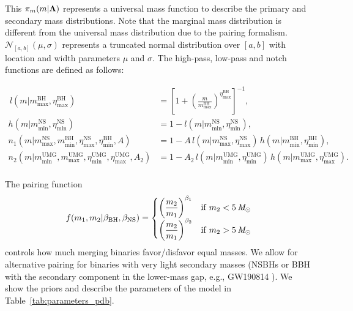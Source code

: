 This $\pi_m(m|\boldsymbol{\Lambda})$ represents a universal mass function to describe the primary and secondary mass distributions. Note that the marginal mass distribution is different from the universal mass distribution due to the pairing formalism.
$\mathcal{N}_{[a,b]}(\mu, \sigma)$ represents a truncated normal distribution over $[a,b]$ with location and width parameters $\mu$ and $\sigma$. 
The high-pass, low-pass and notch functions are defined as follows:

\begin{align}
    \,l(m|m_\text{max}^\text{BH}, \eta_\text{max}^\text{BH}) &= \left[1+\left(\frac{m}{m_\text{max}^\text{BH}}\right)^{\eta_\text{max}^\text{BH}}\right]^{-1},\\
    h(m|m_\text{min}^\text{NS}, \eta_\text{min}^\text{NS}) &= 1 - l(m|m_\text{min}^\text{NS}, \eta_\text{min}^\text{NS}),\\
    n_1(m|m_\text{max}^\text{NS}, m_\text{min}^\text{BH}, \eta_\text{max}^\text{NS}, \eta_\text{min}^\text{BH}, A) &= 1 - A \,l(m|m_\text{max}^\text{NS}, \eta_\text{max}^\text{NS}) \,h(m|m_\text{min}^\text{BH}, \eta_\text{min}^\text{BH}),\\
	n_2(m|m_\text{min}^\text{UMG}, m_\text{max}^\text{UMG}, \eta_\text{min}^\text{UMG}, \eta_\text{max}^\text{UMG}, A_2) &= 1 - A_2 \,l(m|m_\text{min}^\text{UMG}, \eta_\text{min}^\text{UMG}) \,h(m|m_\text{max}^\text{UMG}, \eta_\text{max}^\text{UMG}).\\
\end{align}

The pairing function
\begin{equation}
f(m_1,m_2|\beta_{\rm BH}, \beta_{\rm NS}) = \begin{cases}
    \left(\dfrac{m_2}{m_1}\right)^{\beta_{1}} & {\rm if} \; m_2 < 5\,\mathit{M_\odot} \\
    \left(\dfrac{m_2}{m_1}\right)^{\beta_{2}} & {\rm if} \; m_2 > 5\,\mathit{M_\odot} \\
\end{cases}
\end{equation}
controls how much merging binaries favor/disfavor equal masses. We allow for alternative pairing for binaries with very light secondary masses (\acp{NSBH} or \ac{BBH} with the secondary component in the lower-mass gap, e.g., GW190814 \citealt{LIGOScientific:2020zkf}).
We show the priors and describe the parameters of the \PDB model in Table~\ref{tab:parameters_pdb}.


